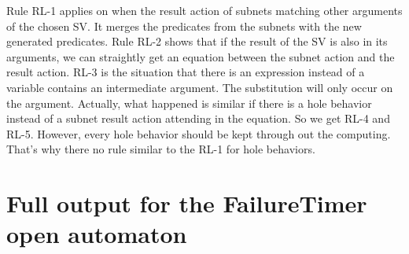 \documentclass{lncs/llncs}
\newcommand{\QIN}[1]{\textcolor{airforceblue}{#1}}
\begin{document}
\QIN{
Rule RL-1 applies on when the result action of subnets matching other arguments of the chosen SV. It merges the predicates from the subnets with the new generated predicates.
Rule RL-2 shows that if the result of the SV is also in its arguments, we can straightly get an equation between the subnet action and  the result action. RL-3 is the situation that there is an expression instead of a variable contains an intermediate argument. The substitution will only occur on the argument.
Actually, what happened is similar if there is a hole behavior instead of a subnet result action attending in the equation. So we get RL-4 and RL-5. However, every hole behavior should be kept through out the computing. That's why there no rule similar to the RL-1 for hole behaviors.
}




\section{Full output for the FailureTimer open automaton}
\label{appendix:fullOutput}
\end{document}
